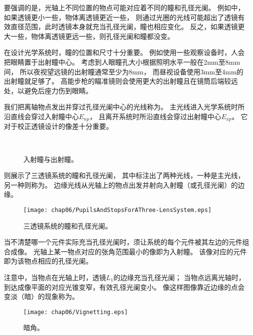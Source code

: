 要强调的是，光轴上不同位置的物点可能对应着不同的瞳和孔径光阑。
例如中，如果透镜更小一些，物体离透镜更近一些，
则通过光圈的光线可能超出了透镜有效直径范围，此时透镜本身就充当孔径光阑，瞳也相应变化。
反之，如果透镜更大一些，物体离透镜更远一些，则孔径光阑和瞳都没变。

在设计光学系统时，瞳的位置和尺寸十分重要。
例如使用一些观察设备时，人会把眼睛置于出射瞳中心。
考虑到人眼瞳孔大小根据照明水平一般在2mm至8mm间，
所以夜视望远镜的出射瞳通常至少为8mm，
而昼视设备使用3mm至4mm的出射瞳就足够了。
高能步枪的瞄准镜则会使用更大的出射瞳且在镜筒后端较远处，以避免后座力伤到眼睛。

我们把离轴物点发出并穿过孔径光阑中心的光线称为。
主光线进入光学系统时所沿直线会穿过入射瞳中心$E_{np}$，
且离开系统时所沿直线会穿过出射瞳中心$E_{xp}$。
它对于校正透镜设计的像差十分重要。
\begin{figure}[htbp]
    \centering
    \\
    \caption{入射瞳与出射瞳。}
    \label{fig:6.49}
\end{figure}

则展示了三透镜系统的瞳和孔径光阑，
其中标注出了两种光线，一种是主光线，另一种则称为。
边缘光线从光轴上的物点出发并射向入射瞳（或孔径光阑）的边缘。
\begin{figure}[htbp]
    \centering\texttt{[image: chap06/PupilsAndStopsForAThree-LensSystem.eps]}
    \caption{三透镜系统的瞳和孔径光阑。}
    \label{fig:6.50}
\end{figure}

当不清楚哪一个元件实际充当孔径光阑时，须让系统的每个元件被其左边的元件组合成像。
光轴上某一物点对应的张角范围最小的像即为入射瞳。
该像对应的元件即为该物点相应的孔径光阑。

注意中，当物点在光轴上时，透镜$L_1$的边缘充当孔径光阑；
当物点远离光轴时，到达成像平面的对应光锥变窄，有效孔径光阑变小。
像这样图像靠近边缘的点会变淡（暗）的现象称为。
\begin{figure}[htbp]
    \centering\texttt{[image: chap06/Vignetting.eps]}
    \caption{暗角。}
    \label{fig:6.51}
\end{figure}

